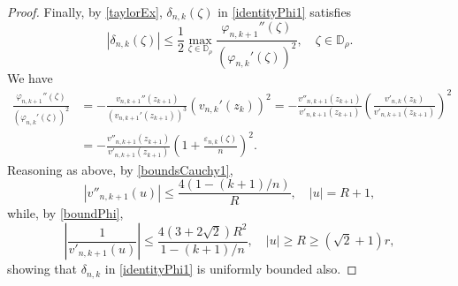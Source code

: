 \documentclass[10pt,a4paper]{amsart}
\theoremstyle{plain}
\theoremstyle{remark}
\newcommand{\D}{\mathbb{D}}
\begin{document}
\begin{proof}
Finally, by \eqref{taylorEx}, $\delta_{n, k}(\zeta)$ in \eqref{identityPhi1} satisfies   
\begin{equation}
    \label{eq:13}
\left|\delta_{n, k}(\zeta)\right| \leq \frac{1}{2 }   \max _{\zeta \in \D_\rho} \frac{ \varphi_{n, k+1}'' \left(\zeta\right)}{ \left( \varphi_{n, k}' \left(\zeta\right)\right)^2 },\quad \zeta\in \D_\rho.
\end{equation}
We have
\begin{align*}
\frac{ \varphi_{n, k+1}'' \left(\zeta\right)}{ \left( \varphi_{n, k}' \left(\zeta\right)\right)^2 } 
&= - \frac{   \,v_{n, k+1}''  \left(z_{k+1} \right)}{ \left(   v_{n, k+1}' \left(z_{k+1}\right)\right)^3 } \left(  v_{n, k}' \left(z_k\right)\right)^2 
= - \frac{   v''_{n, k+1} \left(z_{k+1} \right)}{    v'_{n, k+1} \left(z_{k+1}\right)  } \left( \frac{  v'_{n, k} \left(z_k\right)}{  v'_{n, k+1} \left(z_{k+1} \right)}\right)^2 
\\
& = - \frac{   v''_{n, k+1} \left(z_{k+1} \right)}{   v'_{n, k+1} \left(z_{k+1}\right)  } \left(  1+ \frac{\varepsilon_{n,k}(\zeta)}{n}\right)^2.
\end{align*}
Reasoning as above, by \eqref{boundsCauchy1},
$$
\left|   v''_{n, k+1} \left(u \right)\right| \le   \frac{4\left( 1-(k+1)/n\right)}{R}, \quad |u|=R+1,
$$
while, by \eqref{boundPhi},
$$
\left| \frac{1}{  v'_{n, k+1}(u) } \right| \le   \frac{4(3+2 \sqrt{2}) R^2}{1-(k+1)/n}, \quad |u|\ge R\ge (\sqrt{2}+1)r,
$$
showing that $\delta_{n,k}$ in \eqref{identityPhi1} is uniformly bounded also.
\end{proof}
\end{document}

